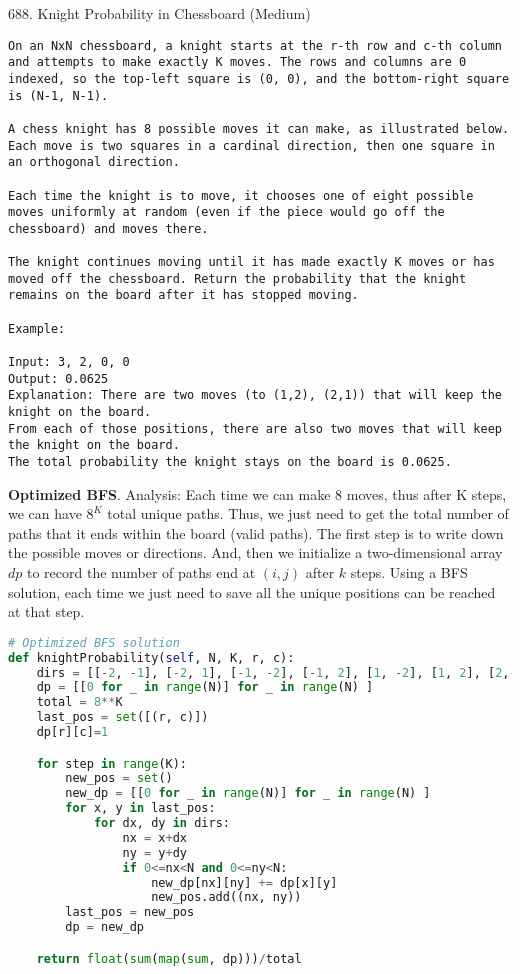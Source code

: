 \documentclass[../main.tex]{subfiles}
\begin{document}



688. Knight Probability in Chessboard (Medium)
\begin{lstlisting}
On an NxN chessboard, a knight starts at the r-th row and c-th column and attempts to make exactly K moves. The rows and columns are 0 indexed, so the top-left square is (0, 0), and the bottom-right square is (N-1, N-1).

A chess knight has 8 possible moves it can make, as illustrated below. Each move is two squares in a cardinal direction, then one square in an orthogonal direction.

Each time the knight is to move, it chooses one of eight possible moves uniformly at random (even if the piece would go off the chessboard) and moves there.

The knight continues moving until it has made exactly K moves or has moved off the chessboard. Return the probability that the knight remains on the board after it has stopped moving.

Example:

Input: 3, 2, 0, 0
Output: 0.0625
Explanation: There are two moves (to (1,2), (2,1)) that will keep the knight on the board.
From each of those positions, there are also two moves that will keep the knight on the board.
The total probability the knight stays on the board is 0.0625.
\end{lstlisting}
\textbf{Optimized BFS}. Analysis: Each time we can make 8 moves, thus after K steps, we can have $8^K$ total unique paths. Thus, we just need to get the total number of paths that it ends within the board (valid paths). The first step is to write down the possible moves or directions. And, then we initialize a two-dimensional array $dp$ to record the number of paths end at $(i, j)$ after $k$ steps. Using a BFS solution, each time we just need to save all the unique positions can be reached at that step. 
\begin{lstlisting}[language=Python]
# Optimized BFS solution
def knightProbability(self, N, K, r, c):
    dirs = [[-2, -1], [-2, 1], [-1, -2], [-1, 2], [1, -2], [1, 2], [2,-1],[2, 1]]
    dp = [[0 for _ in range(N)] for _ in range(N) ]
    total = 8**K
    last_pos = set([(r, c)])
    dp[r][c]=1

    for step in range(K):
        new_pos = set()
        new_dp = [[0 for _ in range(N)] for _ in range(N) ]
        for x, y in last_pos:
            for dx, dy in dirs:
                nx = x+dx
                ny = y+dy
                if 0<=nx<N and 0<=ny<N:
                    new_dp[nx][ny] += dp[x][y]
                    new_pos.add((nx, ny))
        last_pos = new_pos
        dp = new_dp

    return float(sum(map(sum, dp)))/total
\end{lstlisting}
\end{document}
